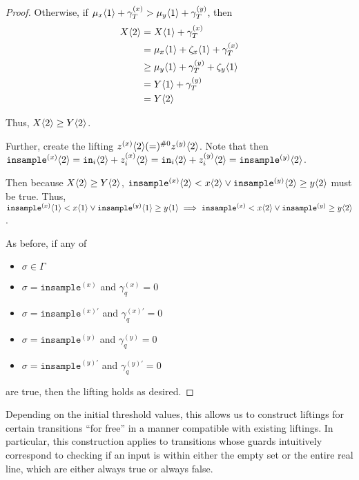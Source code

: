 \begin{proof}
    Otherwise, if $\mu_x\langle1 \rangle+\gamma_T^{(x)}> \mu_y\langle1 \rangle+\gamma_T^{(y)}$, then \begin{align*}
        X\langle2 \rangle &= X\langle1 \rangle + \gamma_T^{(x)}\\
        &=\mu_x\langle1 \rangle + \zeta_x\langle1 \rangle + \gamma_T^{(x)}\\
        &\geq \mu_y\langle1 \rangle +\gamma_T^{(y)}+\zeta_y\langle1 \rangle\\
        &=Y\langle1 \rangle + \gamma_T^{(y)}\\
        &= Y\langle2 \rangle
    \end{align*}

    Thus, $X\langle2 \rangle\geq Y\langle2 \rangle$.

    Further, create the lifting $z^{(x)}\langle2 \rangle(=)^{\#0}z^{(y)}\langle2 \rangle$. Note that then $\texttt{insample}^{(x)}\langle2 \rangle=\texttt{in}_i\langle2 \rangle + z_i^{(x)}\langle2 \rangle =\texttt{in}_i\langle2 \rangle + z_i^{(y)}\langle2 \rangle=\texttt{insample}^{(y)}\langle2 \rangle$.

    Then because $X\langle2 \rangle \geq Y\langle2 \rangle$, $\texttt{insample}^{(x)}\langle2 \rangle<x\langle2 \rangle\lor \texttt{insample}^{(y)}\langle2 \rangle\geq y\langle2 \rangle$ must be true. Thus, $\texttt{insample}^{(x)}\langle1 \rangle<x\langle1 \rangle\lor\texttt{insample}^{(y)}\langle1 \rangle\geq y\langle1 \rangle\implies \texttt{insample}^{(x)}<x\langle2 \rangle\lor\texttt{insample}^{(y)}\geq y\langle2 \rangle$.

    As before, if any of \begin{itemize}
        \item $\sigma \in \Gamma$
        \item $\sigma = \texttt{insample}^{(x)}$ and $\gamma_q^{(x)}=0$ 
        \item $\sigma = \texttt{insample}^{(x)\prime}$ and $\gamma_q^{(x)\prime}=0$ 
        \item $\sigma = \texttt{insample}^{(y)}$ and $\gamma_q^{(y)}=0$
        \item $\sigma = \texttt{insample}^{(y)\prime}$ and $\gamma_q^{(y)\prime}=0$
    \end{itemize}
    are true, then the lifting holds as desired. 

\end{proof}

Depending on the initial threshold values, this allows us to construct liftings for certain transitions ``for free'' in a manner compatible with existing liftings. In particular, this construction applies to transitions whose guards intuitively correspond to checking if an input is within either the empty set or the entire real line, which are either always true or always false. 

